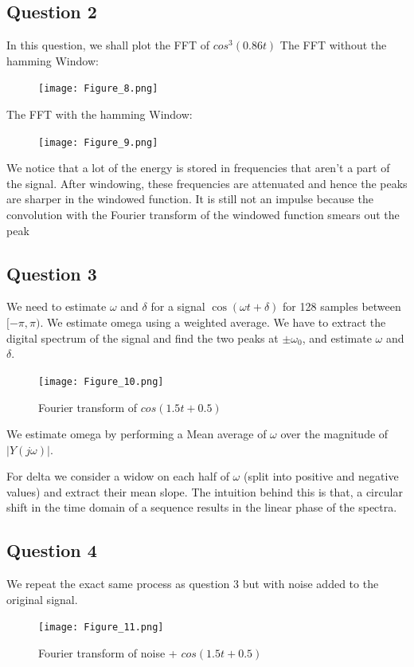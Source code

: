 \documentclass{article}
\begin{document}
\subsection{Question 2}
In this question, we shall plot the FFT of $cos^3(0.86t)$
The FFT without the hamming Window:
\begin{figure}[h!]
\centering
\texttt{[image: Figure\_8.png]}
\label{fig:universe}
\end{figure}
\clearpage
The FFT with the hamming Window:
\begin{figure}[h!]
\centering
\texttt{[image: Figure\_9.png]}
\label{fig:universe}
\end{figure}
\clearpage
We notice that a lot of the energy is stored in frequencies that aren't a part of the signal. After windowing, these frequencies are attenuated and hence the peaks are sharper in the windowed function. It is still not an impulse because the convolution with the Fourier transform of the windowed function smears out the peak

\subsection{Question 3}
We need to estimate $\omega$ and $\delta$ for a signal $\cos(\omega t + \delta)$ for 128 samples between $[-\pi,\pi)$. We estimate omega using a weighted average. We have to extract the digital spectrum of the signal and find the two peaks at $\pm\omega_0$, and estimate $\omega$ and $\delta$.
\begin{figure}[h!]
\centering
\texttt{[image: Figure\_10.png]}
\caption{Fourier transform of $cos(1.5t+0.5)$}
\label{fig:universe}
\end{figure}

We estimate omega by performing a Mean average of $\omega$ over the magnitude of $|Y(j\omega)|$.

For delta we consider a widow on each half of $\omega$ (split into positive and negative values) and extract their mean slope. The intuition behind this is that, a circular shift in the time domain of a sequence results in the linear phase of the spectra.


\subsection{Question 4}
We repeat the exact same process as question 3 but with noise added to the original signal.
\begin{figure}[h!]
\centering
\texttt{[image: Figure\_11.png]}
\caption{Fourier transform of noise + $cos(1.5t+0.5)$}
\label{fig:universe}
\end{figure}
\end{document}

